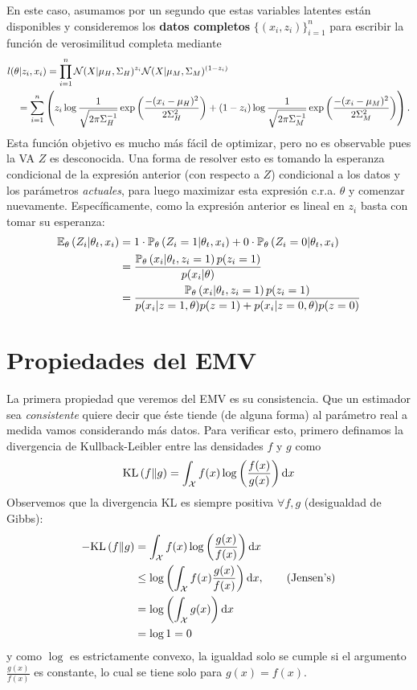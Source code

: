 En este caso, asumamos por un segundo que estas variables latentes están disponibles y consideremos los \textbf{datos completos} $\{(x_i,z_i)\}_{i=1}^n$ para escribir la función de verosimilitud completa mediante
\begin{align*}
	l(\theta|z_i,x_i) &= \prod_{i=1}^n \cN(X|\mu_H,\Sigma_H)^{z_i} \cN(X|\mu_M,\Sigma_M)^{(1-z_i)}\\
	&\hspace{-3em}= \sum_{i=1}^n \left( z_i\log\frac{1}{\sqrt{2\pi\Sigma_H^{-1}}}\expo{\frac{-(x_i-\mu_H)^2}{2\Sigma^2_H}} + (1-z_i)\log\frac{1}{\sqrt{2\pi\Sigma_M^{-1}}}\expo{\frac{-(x_i-\mu_M)^2}{2\Sigma^2_M}}\right).
\end{align*}
Esta función objetivo es mucho más fácil de optimizar, pero no es observable pues la VA $Z$ es desconocida. Una forma de resolver esto es tomando la esperanza condicional de la expresión anterior (con respecto a $Z$) condicional a los datos y los parámetros \textit{actuales}, para luego maximizar esta expresión c.r.a. $\theta$ y comenzar nuevamente. Específicamente, como la expresión anterior es lineal en $z_i$ basta con tomar su esperanza: 
\begin{align*}
	\mathbb{E}_\theta \left(Z_i|\theta_t,x_i\right) &= 1\cdot\mathbb{P}_\theta \left(Z_i=1|\theta_t,x_i\right) + 0\cdot\mathbb{P}_\theta \left(Z_i=0|\theta_t,x_i\right)\\
	&= 	\frac{\mathbb{P}_\theta \left(x_i|\theta_t,z_i=1\right) p(z_i=1)}{p(x_i|\theta)}\\
	&= 	\frac{\mathbb{P}_\theta \left(x_i|\theta_t,z_i=1\right) p(z_i=1)}{p(x_i|z=1,\theta)p(z=1)+p(x_i|z=0	,\theta)p(z=0)}
\end{align*}








\section{Propiedades del EMV} %
\label{sec:propiedades_EMV}

La primera propiedad que veremos del EMV es su consistencia. Que un estimador sea \textit{consistente} quiere decir que éste tiende (de alguna forma) al parámetro real a medida vamos considerando más datos. Para verificar esto, primero definamos la divergencia de Kullback-Leibler entre las densidades $f$ y $g$ como 
\begin{equation}
	\text{KL}\left(f\middle\|g\right) = \int_{\mathcal X} f(x)\log\left(\frac{f(x)}{g(x)}\right){\text{d}x}
\end{equation}
Observemos que la divergencia KL es siempre positiva $\forall f,g$ (desigualdad de Gibbs):
\begin{align*}
 	-\text{KL}\left(f\middle\|g\right)  &= \int_{\mathcal X} f(x)\log\left(\frac{g(x)}{f(x)}\right){\text{d}x}\\
 				&\leq \log\left(\int_{\mathcal X} f(x)\frac{g(x)}{f(x)}\right){\text{d}x}, \quad\quad \text{(Jensen's)}\\
 				&= \log\left(\int_{\mathcal X} g(x)\right){\text{d}x}\\
 				&=\log 1=0	
 \end{align*} 
 y como $\log$ es estrictamente convexo, la igualdad solo se cumple si el argumento $\frac{g(x)}{f(x)}$ es constante, lo cual se tiene solo para ${g(x)} = {f(x)}$.

